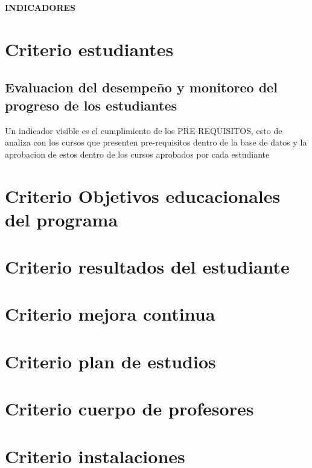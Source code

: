 \documentclass[12pt,a4paper]{report}
\begin{document}


\tableofcontents
\newpage

\begin{Large}
\textbf{INDICADORES} \\
\end{Large}
\section{Criterio estudiantes}

\subsection{Evaluacion del desempeño y monitoreo del progreso de los estudiantes}
Un indicador visible es el cumplimiento de los PRE-REQUISITOS, esto de analiza con los cursos que presenten pre-requisitos dentro de la base de datos y la aprobacion de estos dentro de los cursos aprobados por cada estudiante

\section{ Criterio Objetivos educacionales del programa}

\section{ Criterio resultados del estudiante}

\section{ Criterio mejora continua}

\section{ Criterio plan de estudios}

\section{ Criterio cuerpo de profesores}

\section{ Criterio instalaciones}
\end{document}
